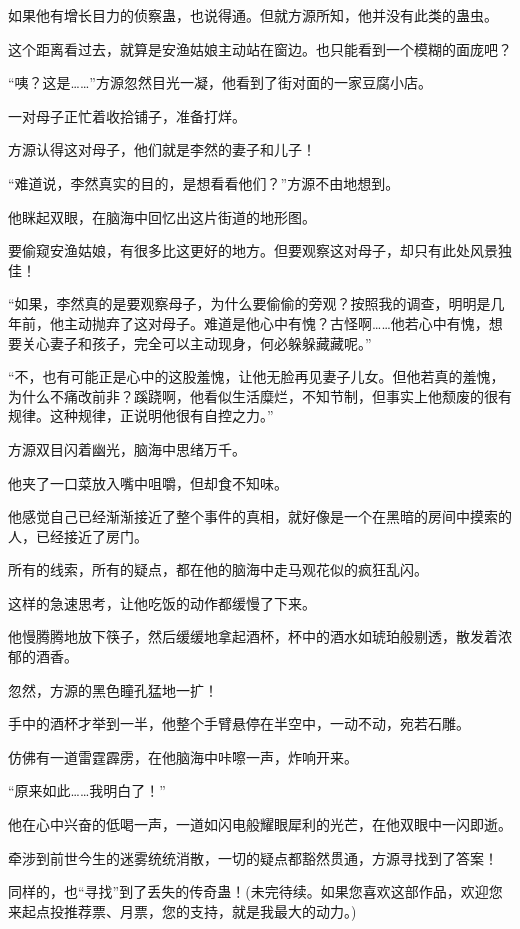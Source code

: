 \begin{this_body}
如果他有增长目力的侦察蛊，也说得通。但就方源所知，他并没有此类的蛊虫。

这个距离看过去，就算是安渔姑娘主动站在窗边。也只能看到一个模糊的面庞吧？

“咦？这是……”方源忽然目光一凝，他看到了街对面的一家豆腐小店。

一对母子正忙着收拾铺子，准备打烊。

方源认得这对母子，他们就是李然的妻子和儿子！

“难道说，李然真实的目的，是想看看他们？”方源不由地想到。

他眯起双眼，在脑海中回忆出这片街道的地形图。

要偷窥安渔姑娘，有很多比这更好的地方。但要观察这对母子，却只有此处风景独佳！

“如果，李然真的是要观察母子，为什么要偷偷的旁观？按照我的调查，明明是几年前，他主动抛弃了这对母子。难道是他心中有愧？古怪啊……他若心中有愧，想要关心妻子和孩子，完全可以主动现身，何必躲躲藏藏呢。”

“不，也有可能正是心中的这股羞愧，让他无脸再见妻子儿女。但他若真的羞愧，为什么不痛改前非？蹊跷啊，他看似生活糜烂，不知节制，但事实上他颓废的很有规律。这种规律，正说明他很有自控之力。”

方源双目闪着幽光，脑海中思绪万千。

他夹了一口菜放入嘴中咀嚼，但却食不知味。

他感觉自己已经渐渐接近了整个事件的真相，就好像是一个在黑暗的房间中摸索的人，已经接近了房门。

所有的线索，所有的疑点，都在他的脑海中走马观花似的疯狂乱闪。

这样的急速思考，让他吃饭的动作都缓慢了下来。

他慢腾腾地放下筷子，然后缓缓地拿起酒杯，杯中的酒水如琥珀般剔透，散发着浓郁的酒香。

忽然，方源的黑色瞳孔猛地一扩！

手中的酒杯才举到一半，他整个手臂悬停在半空中，一动不动，宛若石雕。

仿佛有一道雷霆霹雳，在他脑海中咔嚓一声，炸响开来。

“原来如此……我明白了！”

他在心中兴奋的低喝一声，一道如闪电般耀眼犀利的光芒，在他双眼中一闪即逝。

牵涉到前世今生的迷雾统统消散，一切的疑点都豁然贯通，方源寻找到了答案！

同样的，也“寻找”到了丢失的传奇蛊！(未完待续。如果您喜欢这部作品，欢迎您来起点投推荐票、月票，您的支持，就是我最大的动力。)

\end{this_body}

